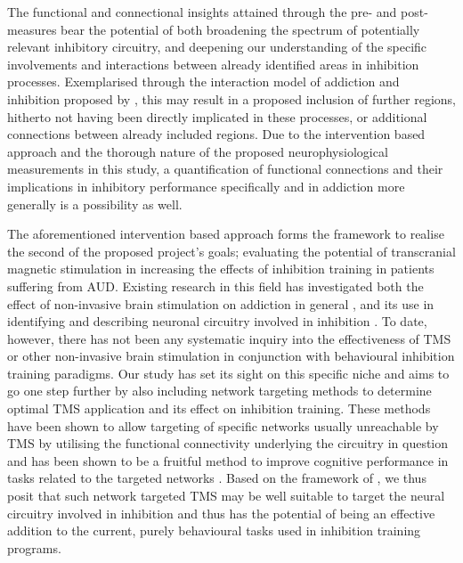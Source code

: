 \documentclass[12pt]{article}
\begin{document}
The functional and connectional insights attained through the pre- and post-measures bear the potential of both broadening the spectrum of potentially relevant inhibitory circuitry, and deepening our understanding of the specific involvements and interactions between already identified areas in inhibition processes. Exemplarised through the interaction model of addiction and inhibition proposed by \textcite{volkowAddictionScienceUncovering2014}, this may result in a proposed inclusion of further regions, hitherto not having been directly implicated in these processes, or additional connections between already included regions. Due to the intervention based approach and the thorough nature of the proposed neurophysiological measurements in this study, a quantification of functional connections and their implications in inhibitory performance specifically and in addiction more generally is a possibility as well.

The aforementioned intervention based approach forms the framework to realise the second of the proposed project's goals; evaluating the potential of transcranial magnetic stimulation in increasing the effects of inhibition training in patients suffering from AUD. Existing research in this field has investigated both the effect of non-invasive brain stimulation on addiction in general \parencite{antonelliTranscranialMagneticStimulation2021,mostafaviNoninvasiveBrainStimulation2020,zhangEffectsRepetitiveTranscranial2019}, and its use in identifying and describing neuronal circuitry involved in inhibition \parencite{naim-feilCorticalInhibitionMotor2016,quoilinNeuralBasesInhibitory2021}. To date, however, there has not been any systematic inquiry into the effectiveness of TMS or other non-invasive brain stimulation in conjunction with behavioural inhibition training paradigms. Our study has set its sight on this specific niche and aims to go one step further by also including network targeting methods to determine optimal TMS application and its effect on inhibition training. These methods have been shown to allow targeting of specific networks usually unreachable by TMS by utilising the functional connectivity underlying the circuitry in question and has been shown to be a fruitful method to improve cognitive performance in tasks related to the targeted networks \parencite{momiCognitiveEnhancementNetworkTargeted2020}. Based on the framework of \textcite{volkowAddictionScienceUncovering2014}, we thus posit that such network targeted TMS may be well suitable to target the neural circuitry involved in inhibition and thus has the potential of being an effective addition to the current, purely behavioural tasks used in inhibition training programs.
\end{document}
